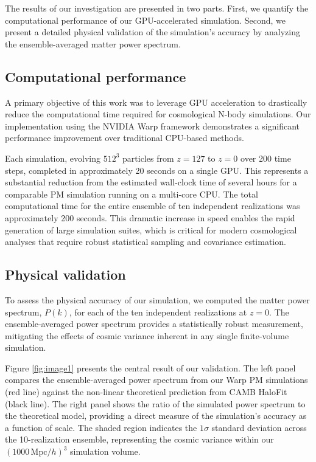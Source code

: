 \documentclass[]{article}
\begin{document}
The results of our investigation are presented in two parts. First, we quantify the computational performance of our GPU-accelerated simulation. Second, we present a detailed physical validation of the simulation's accuracy by analyzing the ensemble-averaged matter power spectrum.

\subsection{Computational performance}
A primary objective of this work was to leverage GPU acceleration to drastically reduce the computational time required for cosmological N-body simulations. Our implementation using the NVIDIA Warp framework demonstrates a significant performance improvement over traditional CPU-based methods.

Each simulation, evolving $512^3$ particles from $z=127$ to $z=0$ over 200 time steps, completed in approximately 20 seconds on a single GPU. This represents a substantial reduction from the estimated wall-clock time of several hours for a comparable PM simulation running on a multi-core CPU. The total computational time for the entire ensemble of ten independent realizations was approximately 200 seconds. This dramatic increase in speed enables the rapid generation of large simulation suites, which is critical for modern cosmological analyses that require robust statistical sampling and covariance estimation.

\subsection{Physical validation}
To assess the physical accuracy of our simulation, we computed the matter power spectrum, $P(k)$, for each of the ten independent realizations at $z=0$. The ensemble-averaged power spectrum provides a statistically robust measurement, mitigating the effects of cosmic variance inherent in any single finite-volume simulation.

Figure \ref{fig:image1} presents the central result of our validation. The left panel compares the ensemble-averaged power spectrum from our Warp PM simulations (red line) against the non-linear theoretical prediction from CAMB HaloFit (black line). The right panel shows the ratio of the simulated power spectrum to the theoretical model, providing a direct measure of the simulation's accuracy as a function of scale. The shaded region indicates the $1\sigma$ standard deviation across the 10-realization ensemble, representing the cosmic variance within our $(1000 \, \text{Mpc}/h)^3$ simulation volume.
\end{document}
